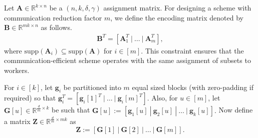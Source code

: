\documentclass[journal,draftcls,onecolumn]{IEEEtran}
\theoremstyle{mystyle}
\newcommand{\bfZ}{\mathbf{Z}}
\newcommand{\bfA}{\mathbf{A}}
\newcommand{\bfg}{\mathbf{g}}
\begin{document}
Let $\bfA \in \mathbb{R}^{k \times n}$ be a $(n,k,\delta, \gamma)$ assignment matrix. For designing a scheme with communication reduction factor $m$, we define the encoding matrix denoted by $\mathbf{B} \in \mathbb{R}^{mk \times n}$ as follows.
\begin{align*}
\mathbf{B}^T = [\bfA_1^T ~|~ \dots ~|~ \bfA_m^T],
\end{align*}
where $\text{supp}(\bfA_i) \subseteq  \text{supp}(\bfA)$ for $i \in [m]$. This constraint ensures that the communication-efficient scheme operates with the same assignment of subsets to workers.

For $i \in [k]$, let $\bfg_i$ be partitioned into $m$ equal sized blocks (with zero-padding if required) so that $\bfg_i^T = [\bfg_i[1]^T ~|~ \dots ~|~\bfg_i[m]^T]$. Also, for $u \in [m]$, let $\mathbf{G}[u] \in \mathbb{R}^{\frac{d}{m} \times k}$ be such that $\mathbf{G}[u] := [\mathbf{g}_1[u] ~|~\mathbf{g}_2[u] ~|~ \dots ~|~\mathbf{g}_k[u]].$
Now define a matrix $\mathbf{Z} \in \mathbb{R}^{\frac{d}{m} \times mk}$ as
\[\mathbf{Z} := [ \mathbf{G}[1] ~|~ \mathbf{G}[2] ~|~\dots~|~ \mathbf{G}[m] ].\]


\end{document}
